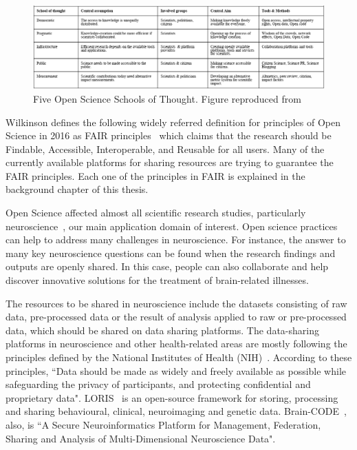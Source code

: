 \begin{figure}[ht]
  \centering
  \includegraphics[width=\textwidth]{figures/5schools.png}
  \caption{Five Open Science Schools of Thought. Figure reproduced from~\cite{fecher2014open} }
  \label{fig:5schools}
\end{figure} 


Wilkinson defines the following widely referred definition for principles of Open Science in 2016 as FAIR principles~\cite{wilkinson2016fair} which claims that the research should be Findable, Accessible, Interoperable, and Reusable for all users. Many of the currently available platforms for sharing resources are trying to guarantee the FAIR principles. Each one of the principles in FAIR is explained in the background chapter of this thesis.  

Open Science affected almost all scientific research studies, particularly neuroscience~\cite{abrams2021standards}, our main application domain of interest. Open science practices can help to address many challenges in neuroscience. For instance, the answer to many key neuroscience questions can be found when the research findings and outputs are openly shared. In this case, people can also collaborate and help discover innovative solutions for the treatment of brain-related illnesses. 

The resources to be shared in neuroscience include the datasets consisting of raw data, pre-processed data or the result of analysis applied to raw or pre-processed data, which should be shared on data sharing platforms. The data-sharing platforms in neuroscience and other health-related areas are mostly following the principles defined by the National Institutes of Health (NIH)~\cite{NIMHDataArchive}. According to these principles, ``Data should be made as widely and freely available as possible while safeguarding the privacy of participants, and protecting confidential and proprietary data". LORIS~\cite{loris} is an open-source framework for storing, processing and sharing behavioural, clinical, neuroimaging and genetic data. Brain-CODE~\cite{vaccarino2018brain}, also, is ``A Secure Neuroinformatics Platform for Management, Federation, Sharing and Analysis of Multi-Dimensional Neuroscience Data".


